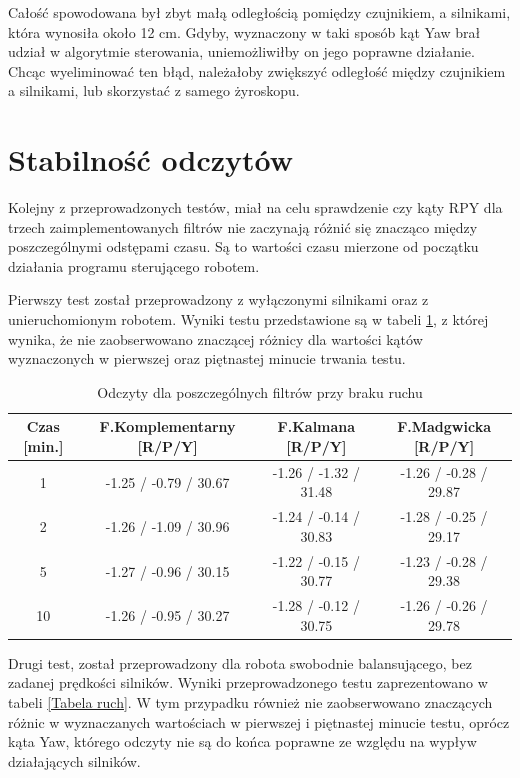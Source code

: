 Całość spowodowana był zbyt małą odległością pomiędzy czujnikiem, a silnikami, która wynosiła około 12 cm. Gdyby, wyznaczony w taki sposób kąt Yaw brał udział w algorytmie sterowania, uniemożliwiłby on jego poprawne działanie. Chcąc wyeliminować ten błąd, należałoby zwiększyć odległość między czujnikiem a silnikami, lub skorzystać z samego żyroskopu.
\section{Stabilność odczytów}

Kolejny z przeprowadzonych testów, miał na celu sprawdzenie czy kąty RPY dla trzech zaimplementowanych filtrów nie zaczynają różnić się znacząco między poszczególnymi odstępami czasu. Są to wartości czasu mierzone od początku działania programu sterującego robotem.

Pierwszy test został przeprowadzony z wyłączonymi silnikami oraz z unieruchomionym robotem. Wyniki testu przedstawione są w tabeli \ref{Tabela brak ruchu}, z której wynika, że nie zaobserwowano znaczącej różnicy dla wartości kątów wyznaczonych w pierwszej oraz piętnastej minucie trwania testu.

\begin{table}[h!]
    \centering
    \caption{Odczyty dla poszczególnych filtrów przy braku ruchu}
    \begin{tabular}{|c|c|c|c|}
        \hline
        Czas [min.] & F.Komplementarny [R/P/Y] & F.Kalmana [R/P/Y] & F.Madgwicka [R/P/Y] \\
        \hline
        1 & -1.25 / -0.79 / 30.67 & -1.26 / -1.32 / 31.48 & -1.26 / -0.28 / 29.87 \\
        \hline
        2 & -1.26 / -1.09 / 30.96 & -1.24 / -0.14 / 30.83 & -1.28 / -0.25 / 29.17  \\
        \hline
        5 & -1.27 / -0.96 / 30.15 & -1.22 / -0.15 / 30.77 & -1.23 / -0.28 / 29.38  \\
        \hline
        10 & -1.26 / -0.95 / 30.27 & -1.28 / -0.12 / 30.75 & -1.26 / -0.26 / 29.78  \\
        \hline
    \end{tabular}
	\label{Tabela brak ruchu}
\end{table}

Drugi test, został przeprowadzony dla robota swobodnie balansującego, bez zadanej prędkości silników. Wyniki przeprowadzonego testu zaprezentowano w tabeli \ref{Tabela ruch}. W tym przypadku również nie zaobserwowano znaczących różnic w wyznaczanych wartościach w pierwszej i piętnastej minucie testu, oprócz kąta Yaw, którego odczyty nie są do końca poprawne ze względu na wypływ działających silników.

